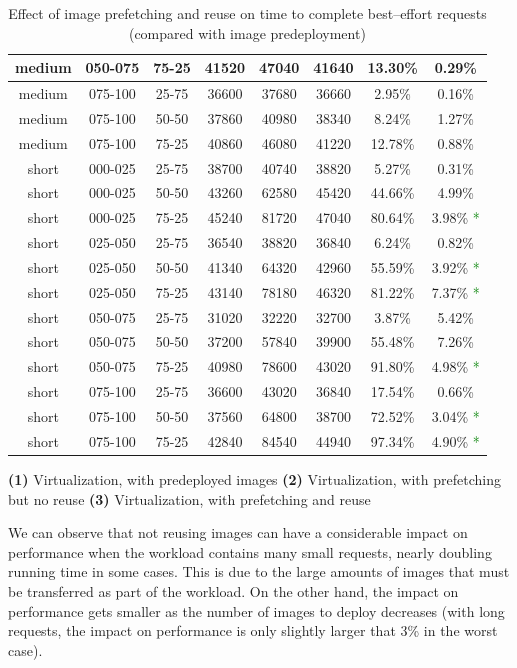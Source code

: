 \begin{table}
\begin{center}
\begin{tabular}{|c|c|c|c|c|c|c|c|}
\\\hline
medium & 050-075 & 75-25 & 41520 & 47040 & 41640 & 13.30\% & 0.29\%
\\\hline
medium & 075-100 & 25-75 & 36600 & 37680 & 36660 & 2.95\% & 0.16\%
\\\hline
medium & 075-100 & 50-50 & 37860 & 40980 & 38340 & 8.24\% & 1.27\%
\\\hline
medium & 075-100 & 75-25 & 40860 & 46080 & 41220 & 12.78\% & 0.88\%
\\\hline
short & 000-025 & 25-75 & 38700 & 40740 & 38820 & 5.27\% & 0.31\%
\\\hline
short & 000-025 & 50-50 & 43260 & 62580 & 45420 & 44.66\% & 4.99\%
\\\hline
short & 000-025 & 75-25 & 45240 & 81720 & 47040 & 80.64\% & 3.98\% \textcolor{green}{*}
\\\hline
short & 025-050 & 25-75 & 36540 & 38820 & 36840 & 6.24\% & 0.82\%
\\\hline
short & 025-050 & 50-50 & 41340 & 64320 & 42960 & 55.59\% & 3.92\% \textcolor{green}{*}
\\\hline
short & 025-050 & 75-25 & 43140 & 78180 & 46320 & 81.22\% & 7.37\% \textcolor{green}{*}
\\\hline
short & 050-075 & 25-75 & 31020 & 32220 & 32700 & 3.87\% & 5.42\%
\\\hline
short & 050-075 & 50-50 & 37200 & 57840 & 39900 & 55.48\% & 7.26\%
\\\hline
short & 050-075 & 75-25 & 40980 & 78600 & 43020 & 91.80\% & 4.98\% \textcolor{green}{*}
\\\hline
short & 075-100 & 25-75 & 36600 & 43020 & 36840 & 17.54\% & 0.66\%
\\\hline
short & 075-100 & 50-50 & 37560 & 64800 & 38700 & 72.52\% & 3.04\% \textcolor{green}{*}
\\\hline
short & 075-100 & 75-25 & 42840 & 84540 & 44940 & 97.34\% & 4.90\% \textcolor{green}{*}
\\\hline
\end{tabular}

\textbf{(1)} Virtualization, with predeployed images
\textbf{(2)} Virtualization, with prefetching but no reuse
\textbf{(3)} Virtualization, with prefetching and reuse
\caption{Effect of image prefetching and reuse on time to complete best--effort requests (compared with image predeployment)}
\label{tab:predeployVSfetch}
\end{center}
\end{table}

We can observe that not reusing images can have a considerable impact on performance when the workload contains many small requests, nearly doubling running time in some cases. This is due to the large amounts of images that must be transferred as part of the workload. On the other hand, the impact on performance gets smaller as the number of images to deploy decreases (with long requests, the impact on performance is only slightly larger that 3\% in the worst case).

